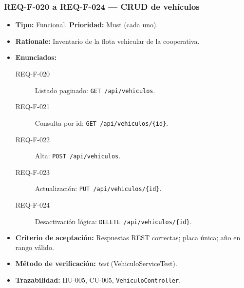 \documentclass[12pt,a4paper]{article}
\begin{document}
\subsubsection{REQ-F-020 a REQ-F-024 — CRUD de vehículos}
\begin{itemize}
  \item \textbf{Tipo:} Funcional. \textbf{Prioridad:} Must (cada uno).
  \item \textbf{Rationale:} Inventario de la flota vehicular de la cooperativa.
  \item \textbf{Enunciados:}
    \begin{description}
      \item[REQ-F-020] Listado paginado: \texttt{GET /api/vehiculos}.
      \item[REQ-F-021] Consulta por id: \texttt{GET /api/vehiculos/\{id\}}.
      \item[REQ-F-022] Alta: \texttt{POST /api/vehiculos}.
      \item[REQ-F-023] Actualización: \texttt{PUT /api/vehiculos/\{id\}}.
      \item[REQ-F-024] Desactivación lógica: \texttt{DELETE /api/vehiculos/\{id\}}.
    \end{description}
  \item \textbf{Criterio de aceptación:} Respuestas REST correctas; placa única; año en rango válido.
  \item \textbf{Método de verificación:} \textit{test} (VehiculoServiceTest).
  \item \textbf{Trazabilidad:} HU-005, CU-005, \texttt{VehiculoController}.
\end{itemize}

\end{document}
